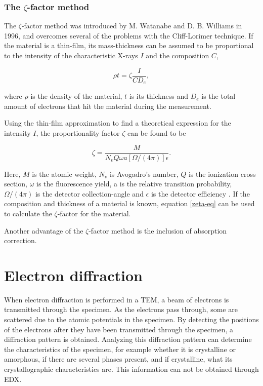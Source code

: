 		\subsubsection{The $\zeta$-factor method}
The $\zeta$-factor method was introduced by M. Watanabe and D. B. Williams in 1996, and overcomes several of the problems with the Cliff-Lorimer technique. If the material is a thin-film, its mass-thickness can be assumed to be proportional to the intensity of the characteristic X-rays $I$ and the composition $C$,

\begin{equation}
\label{zeta-eq}
\rho t = \zeta \frac{I}{C D_e},
\end{equation}

where $\rho$ is the density of the material, $t$ is its thickness and $D_e$ is the total amount of electrons that hit the material during the measurement. 

Using the thin-film approximation to find a theoretical expression for the intensity $I$, the proportionality factor $\zeta$ can be found to be

\begin{equation}
\zeta = \dfrac{M}{N_v Q \omega a [\Omega/(4\pi)]\epsilon}.
\end{equation}

Here, $M$ is the atomic weight, $N_v$ is Avogadro's number, $Q$ is the ionization cross section, $\omega$ is the fluorescence yield, a is the relative transition probability, $\Omega/(4\pi)$ is the detector collection-angle and $\epsilon$ is the detector efficiency \cite{zeta-method}. If the composition and thickness of a material is known, equation \eqref{zeta-eq} can be used to calculate the $\zeta$-factor for the material.

Another advantage of the $\zeta$-factor method is the inclusion of absorption correction. 

\section{Electron diffraction}\label{ED}%
When electron diffraction is performed in a TEM, a beam of electrons is transmitted through the specimen. As the electrons pass through, some are scattered due to the atomic potentials in the specimen. By detecting the positions of the electrons after they have been transmitted through the specimen, a diffraction pattern is obtained. Analyzing this diffraction pattern can determine the characteristics of the specimen, for example whether it is crystalline or amorphous, if there are several phases present, and if crystalline, what its crystallographic characteristics are. This information can not be obtained through EDX.

